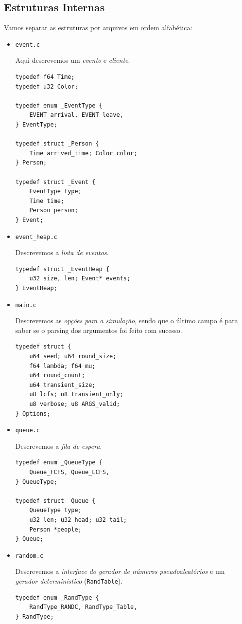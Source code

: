 \documentclass[a4paper]{article}
\newcommand{\arq}{\texttt}
\newcommand{\inlcode}{\texttt}
\begin{document}
\subsection{Estruturas Internas}
Vamos separar as estruturas por arquivos em ordem alfabética:
\begin{itemize}
    \item \arq{event.c} \par
        Aqui descrevemos um \emph{evento} e \emph{cliente}.
        \begin{verbatim}
typedef f64 Time;
typedef u32 Color;

typedef enum _EventType {
    EVENT_arrival, EVENT_leave,
} EventType;

typedef struct _Person {
    Time arrived_time; Color color;
} Person;

typedef struct _Event {
    EventType type;
    Time time;
    Person person;
} Event;
        \end{verbatim}
    \item \arq{event\_heap.c} \par
        Descrevemos a \emph{lista de eventos}.
        \begin{verbatim}
typedef struct _EventHeap {
    u32 size, len; Event* events;
} EventHeap;
        \end{verbatim}
    \item \arq{main.c} \par
        Descrevemos as \emph{opções para a simulação},
        sendo que o último campo é
        para saber se o parsing dos argumentos foi feito com sucesso.
        \begin{verbatim}
typedef struct {
    u64 seed; u64 round_size;
    f64 lambda; f64 mu;
    u64 round_count;
    u64 transient_size;
    u8 lcfs; u8 transient_only;
    u8 verbose; u8 ARGS_valid;
} Options;
        \end{verbatim}
    \item \arq{queue.c} \par
        Descrevemos a \emph{fila de espera}.
        \begin{verbatim}
typedef enum _QueueType {
    Queue_FCFS, Queue_LCFS,
} QueueType;

typedef struct _Queue {
    QueueType type;
    u32 len; u32 head; u32 tail;
    Person *people;
} Queue;
        \end{verbatim}
    \item \arq{random.c} \par
        Descrevemos a \emph{interface
        do gerador de números pseudoaleatórios}
        e um \emph{gerador determinístico}
        (\inlcode{RandTable}).
        \begin{verbatim}
typedef enum _RandType {
    RandType_RANDC, RandType_Table,
} RandType;


\end{verbatim}
\end{itemize}
\end{document}
